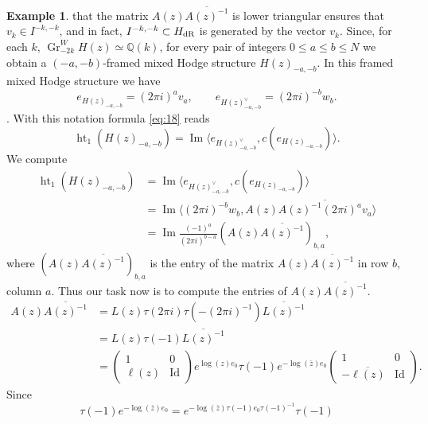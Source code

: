 \documentclass[11pt,a4paper]{amsart}
\newcommand{\dR}{\text{\rm dR}}
\newcommand{\Q}{\mathds{Q}}
\DeclareMathOperator {\Gr} {Gr}
\DeclareMathOperator{\im}{Im}
\DeclareMathOperator{\Id}{Id}
\DeclareMathOperator{\Ht}{ht}
\numberwithin{equation}{section}
\theoremstyle{plain}
\theoremstyle{definition}
\newtheorem{ex}[prop]{Example}
\begin{document}
\begin{ex}
  that the matrix $A(z)\overline{A(z)^{-1}}$ is lower triangular
  ensures that $v_{k}\in I^{-k,-k}$, and in fact, 
  $I^{-k,-k}\subset H_{\dR}$ is generated by the vector $v_{k}$. Since,
  for each $k$, $\Gr_{-2k}^{W}H(z)\simeq \Q(k)$, for every pair of
  integers $0\le a\le b \le N$ we obtain a $(-a,-b)$-framed mixed
  Hodge structure $H(z)_{-a,-b}$. In this framed mixed Hodge structure
  we have
  \begin{displaymath}
    e_{H(z)_{-a,-b}}=(2\pi i)^{a}v_{a},\qquad
    e_{H(z)_{-a,-b}^{\vee}}=(2\pi i)^{-b}w_{b}. 
  \end{displaymath}.
  With this
  notation   formula \eqref{eq:18} reads
  \begin{displaymath}
    \Ht_{1}(H(z)_{-a,-b})=\im\langle e_{H(z)_{-a,-b}^{\vee}},
    c(e_{H(z)_{-a,-b}})\rangle.
  \end{displaymath}
  We compute
  \begin{align*}
    \Ht_{1}(H(z)_{-a,-b})&=\im\langle e_{H(z)_{-a,-b}^{\vee}},
                          c(e_{H(z)_{-a,-b}})\rangle\\
                           & =\im\langle (2\pi i)^{-b}w_{b},
                           A(z) \overline {A(z)^{-1}(2\pi
                             i)^{a}v_{a}}\rangle \\
                         &=\im \frac{(-1)^{a}}{(2\pi i)^{b-a}}(A(z)\overline{A(z)^{-1}})_{b,a}, 
  \end{align*}
  where $(A(z)\overline{A(z)^{-1}})_{b,a}$ is the entry of the matrix
  $A(z)\overline{A(z)^{-1}}$ in row $b$,
  column $a$.  Thus our task
  now is to compute the entries of
  $A(z)\overline{A(z)^{-1}}$. 
  \begin{align*}
    A(z)\overline{A(z)^{-1}}
    &=L(z)\tau (2\pi i)\tau (-(2\pi i)^{-1})\overline {L(z)^{-1}}\\
    &=L(z)\tau (-1)\overline {L(z)^{-1}}\\
    &=  \begin{pmatrix}
      1 & 0\\
      \ell(z) & \Id
    \end{pmatrix}e^{\log (z) e_{0}}
      \tau (-1)e^{- \log (\bar z) e_{0}}
      \begin{pmatrix}
      1 & 0\\
      -\overline{\ell(z)} & \Id
    \end{pmatrix}.
  \end{align*}
  Since
  \begin{displaymath}
    \tau (-1)e^{- \log (\bar z) e_{0}}
    =e^{- \log (\bar z) \tau (-1)e_{0}\tau (-1)^{-1}}\tau (-1)

\end{displaymath}
\end{ex}
\end{document}
